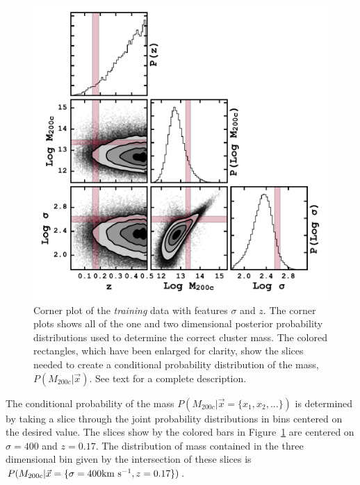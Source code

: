 \documentclass[fleqn,usenatbib]{mnras}
\begin{document}
\begin{figure} 
	\includegraphics[width=\columnwidth]{figures/cornertest.pdf} 
	\caption{Corner plot of the \emph{training} data with features $\sigma$ and $z$. The corner plots shows all of the one and two dimensional posterior probability distributions used to determine the correct cluster mass. The colored rectangles, which have been enlarged for clarity, show the slices needed to create a conditional probability distribution of the mass, $P(M_{200c}|\vec{x})$. See text for a complete description. } \label{fig: probability corner} 
\end{figure}

The conditional probability of the mass $P(M_{200c}|\vec{x}= \{ x_1,x_2,...\})$ is determined by taking a slice through the joint probability distributions in bins centered on the desired value. The slices show by the colored bars in Figure~\ref{fig: probability corner} are centered on $\sigma = 400$ \kms and $z=0.17$. The distribution of mass contained in the three dimensional bin given by the intersection of these slices is $P(M_{200c}|\vec{x} = \{\sigma=400 \hbox{km~s$^{-1}$},z=0.17\})$.
\end{document}
